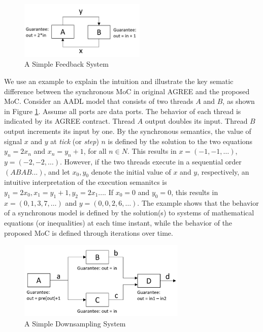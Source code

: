 \begin{figure}[ht!]
\centering
\includegraphics[width=60mm]{simpleFeedback.jpg}
\caption{A Simple Feedback System\label{motivationFig1}}
\end{figure}

We use an example to explain the intuition and illustrate the key sematic difference between the synchronous MoC in original AGREE and the proposed MoC.
Consider an AADL model that consists of two threads $A$ and $B$, as shown in Figure \ref{motivationFig1}. Assume all ports are data ports. The behavior of each thread is indicated by its AGREE contract. Thread $A$ output doubles its input. Thread $B$ output increments its input by one. By the synchronous semantics, the value of signal $x$ and $y$ at \emph{tick} (or \emph{step}) $n$ is defined by the solution to the two equations $y_n = 2x_n$ and $x_n = y_n+1$, for all $n \in N$. This results in $x = (-1, -1, …)$, $y = (-2, -2, …)$. However, if the two threads execute in a sequential order $(ABAB...)$, and let $x_0, y_0$ denote the initial value of $x$ and $y$, respectively, an intuitive interpretation of the execution semanitcs is $y_1 = 2x_0, x_1 = y_1+1, y_2 = 2x_1...$. If $x_0 = 0$ and  $y_0 = 0$, this results in $x = (0, 1, 3, 7,…)$ and $y = (0, 0, 2, 6, …)$. The example shows that the behavior of a synchronous model is defined by the solution(s) to systems of mathematical equations (or inequalities) at each time instant, while the behavior of the proposed MoC is defined through iterations over time. 

\begin{figure}[ht!]
\centering
\includegraphics[width=80mm]{downsample.jpg}
\caption{A Simple Downsampling System\label{motivationFig2}}
\end{figure}

